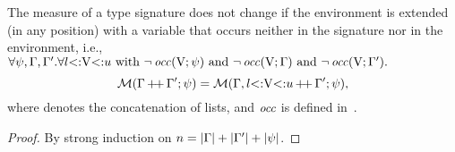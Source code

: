 \begin{lemma}%
\label{lem:msr-weakening}
    The measure of a type signature does not change if the environment
    is extended (in any position) with a variable that occurs neither
    in the signature nor in the environment, i.e.,
    $\forall \psi, \Gamma, \Gamma'. 
    \forall l{\operatorname{<:}}\mathrm{V}{\operatorname{<:}}u \text{ with } 
    \lnot \operatorname{\mathit{occ}}(\mathrm{V};\psi) \text{ and } 
    \lnot \operatorname{\mathit{occ}}(\mathrm{V};\Gamma) \text{ and } \lnot \operatorname{\mathit{occ}}(\mathrm{V};\Gamma').$
    \[\operatorname{\mathcal{M}}(\Gamma\operatorname{+\!+}\Gamma';\psi) = 
        \operatorname{\mathcal{M}}(\Gamma,l{\operatorname{<:}}\mathrm{V}{\operatorname{<:}}u\operatorname{+\!+}\Gamma';\psi),\]
    where  denotes the concatenation of lists,
    and $\operatorname{\mathit{occ}}$ is defined in~.
\end{lemma}
\begin{proof}
    By strong induction on $n = |\Gamma| + |\Gamma'| + |\psi|$.
\end{proof}

